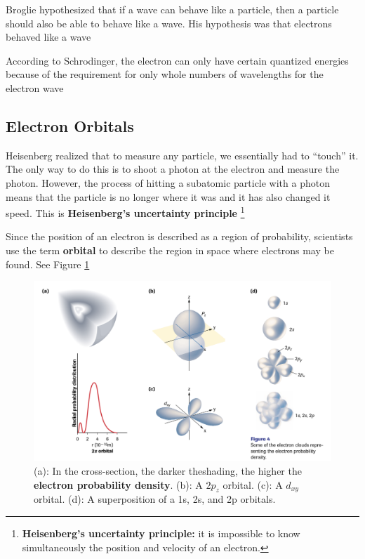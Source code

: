 \begin{bulleted-list}
    \item Broglie hypothesized that if a wave can behave like a particle, then a particle should
        also be able to behave like a wave. His hypothesis was that electrons behaved like a wave
    \item According to Schrodinger, the electron can only have certain quantized energies because
        of the requirement for only whole numbers of wavelengths for the electron wave
\end{bulleted-list}

\subsection{Electron Orbitals}
\begin{bulleted-list}
    \item Heisenberg realized that to measure any particle, we essentially had to ``touch''
        it. The only way to do this is to shoot a photon at the electron and measure the
        photon. However, the process of hitting  a subatomic particle with a photon means that
        the particle is no longer where it was and it has also changed it speed. This is 
        \textbf{Heisenberg's uncertainty principle}
        \footnote{
            \textbf{Heisenberg's uncertainty principle:} it is impossible to know simultaneously
            the position and velocity of an electron.
        }
    \item Since the position of an electron is described as a region of probability, scientists
        use the term \textbf{orbital} to describe the region in space where electrons may be 
        found. See Figure \ref{fig:orbital-shapes}
\end{bulleted-list}

\begin{figure}[ht!]
    \centering
    \includegraphics[width=0.8 \textwidth]{../figures/orbital-shapes.png}
    \caption{(a): In the cross-section, the darker theshading, the higher the \textbf{electron
    probability density}. (b): A $2p_z$ orbital. (c): A $d_{xy}$ orbital. (d): A 
    superposition of a 1s, 2s, and 2p orbitals.
}
    \label{fig:orbital-shapes}
\end{figure}

